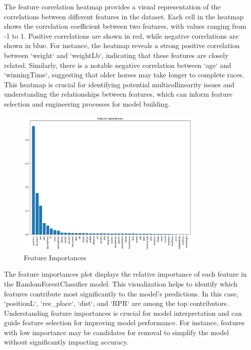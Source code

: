 \documentclass{article}
\begin{document}
The feature correlation heatmap provides a visual representation of the correlations between different features in the dataset. Each cell in the heatmap shows the correlation coefficient between two features, with values ranging from -1 to 1. Positive correlations are shown in red, while negative correlations are shown in blue. For instance, the heatmap reveals a strong positive correlation between `weight` and `weightLb`, indicating that these features are closely related. Similarly, there is a notable negative correlation between `age` and `winningTime`, suggesting that older horses may take longer to complete races. This heatmap is crucial for identifying potential multicollinearity issues and understanding the relationships between features, which can inform feature selection and engineering processes for model building.

\begin{figure}[H]
    \centering
    \includegraphics[width=0.8\textwidth]{images/feature_importances.png} %
    \caption{Feature Importances}
    \label{fig:feature_importances}
\end{figure}

The feature importances plot displays the relative importance of each feature in the RandomForestClassifier model. This visualization helps to identify which features contribute most significantly to the model's predictions. In this case, `positionL`, `res_place`, `dist`, and `RPR` are among the top contributors. Understanding feature importances is crucial for model interpretation and can guide feature selection for improving model performance. For instance, features with low importance may be candidates for removal to simplify the model without significantly impacting accuracy.
\end{document}
